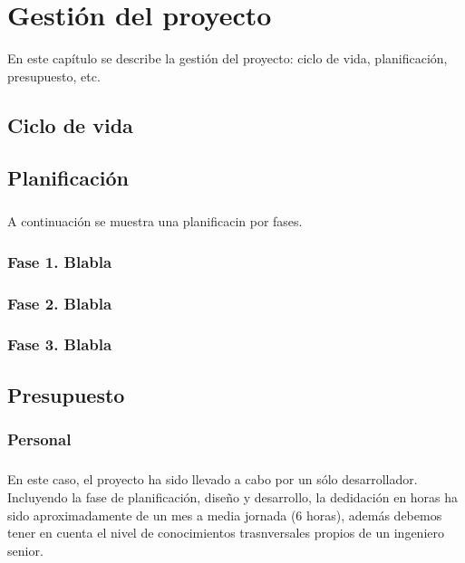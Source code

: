 \chapter{Gestión del proyecto}\label{sec:gestion}

En este capítulo se describe la gestión del proyecto: ciclo de vida, planificación,
presupuesto, etc.

\section{Ciclo de vida}


\section{Planificación}

\paragraph{}A continuación se muestra una planificacin por fases.

\subsection{Fase 1. Blabla}

\subsection{Fase 2. Blabla}

\subsection{Fase 3. Blabla}

\section{Presupuesto}

\subsection{Personal}

\paragraph{} En este caso, el proyecto ha sido llevado a cabo por un sólo desarrollador.
Incluyendo la fase de planificación, diseño y desarrollo, la dedidación en horas ha sido
aproximadamente de un mes a media jornada (6 horas), además debemos tener en cuenta el
nivel de conocimientos trasnversales propios de un ingeniero senior.


